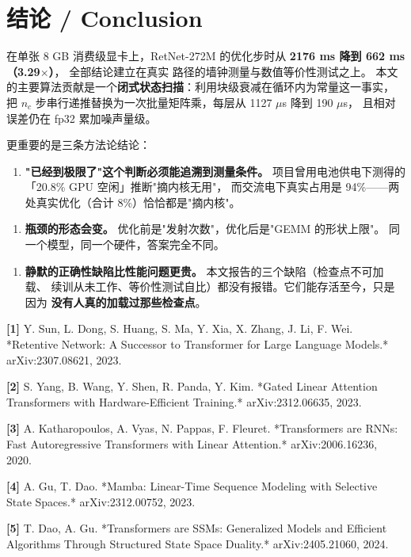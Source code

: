 \documentclass[11pt,openany]{ctexart}
\begin{document}
\section{结论 / Conclusion}

在单张 8 GB 消费级显卡上，RetNet-272M 的优化步时从 \textbf{2176 ms 降到 662 ms（3.29$\times$）}， 全部结论建立在真实  路径的墙钟测量与数值等价性测试之上。 本文的主要算法贡献是一个\textbf{闭式状态扫描}：利用块级衰减在循环内为常量这一事实， 把 $n_c$ 步串行递推替换为一次批量矩阵乘，每层从 1127 $\mu$s 降到 190 $\mu$s， 且相对误差仍在 fp32 累加噪声量级。

更重要的是三条方法论结论：

\begin{enumerate}
  \item \textbf{"已经到极限了"这个判断必须能追溯到测量条件。} 项目曾用电池供电下测得的「20.8\% GPU 空闲」推断"摘内核无用"， 而交流电下真实占用是 94\%——两处真实优化（合计 8\%）恰恰都是"摘内核"。
\end{enumerate}
\begin{enumerate}
  \item \textbf{瓶颈的形态会变。} 优化前是"发射次数"，优化后是"GEMM 的形状上限"。 同一个模型，同一个硬件，答案完全不同。
\end{enumerate}
\begin{enumerate}
  \item \textbf{静默的正确性缺陷比性能问题更贵。} 本文报告的三个缺陷（检查点不可加载、 续训从未工作、等价性测试自比）都没有报错。它们能存活至今，只是因为 \textbf{没有人真的加载过那些检查点}。
\end{enumerate}

\label{sec:refs}

\textbf{[1]} Y. Sun, L. Dong, S. Huang, S. Ma, Y. Xia, X. Zhang, J. Li, F. Wei. *Retentive Network: A Successor to Transformer for Large Language Models.* arXiv:2307.08621, 2023.

\textbf{[2]} S. Yang, B. Wang, Y. Shen, R. Panda, Y. Kim. *Gated Linear Attention Transformers with Hardware-Efficient Training.* arXiv:2312.06635, 2023.

\textbf{[3]} A. Katharopoulos, A. Vyas, N. Pappas, F. Fleuret. *Transformers are RNNs: Fast Autoregressive Transformers with Linear Attention.* arXiv:2006.16236, 2020.

\textbf{[4]} A. Gu, T. Dao. *Mamba: Linear-Time Sequence Modeling with Selective State Spaces.* arXiv:2312.00752, 2023.

\textbf{[5]} T. Dao, A. Gu. *Transformers are SSMs: Generalized Models and Efficient Algorithms Through Structured State Space Duality.* arXiv:2405.21060, 2024.
\end{document}
